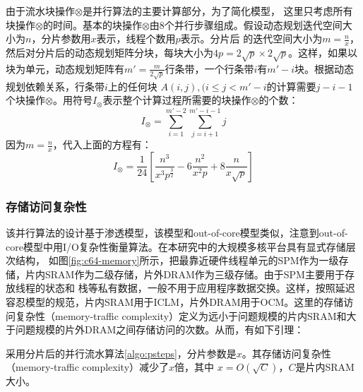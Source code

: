 \begin{flushleft}
由于流水块操作$\otimes$是并行算法的主要计算部分，为了简化模型，
这里只考虑所有块操作$\otimes$的时间。基本的块操作$\otimes$由8个并行步骤组成。假设动态规划迭代空间大小为$n$，分片参数用$x$表示，线程个数用$p$表示。分片后
的迭代空间大小为$m=\frac{n}{x}$，然后对分片后的动态规划矩阵分块，每块大小为$4p=2\sqrt{p}\times
2\sqrt{p}$。这样，如果以块为单元，动态规划矩阵有$m'=\frac{m}{2\sqrt{p}}$行条带，一个行条带$i$有$m'-i$块。根据动态规划依赖关系，行条带$i$上的任何块
$A(i,j),(i\le
j<m'-i$的计算需要$j-i-1$个块操作$\otimes$。用符号$I_{\otimes}$表示整个计算过程所需要的块操作$\otimes$的个数：
\begin{displaymath}
I_{\otimes} = \sum_{i=1}^{m'-2}\sum_{j=i+1}^{m'-i-1}j %
\end{displaymath}
因为$m=\frac{n}{x}$，代入上面的方程有：
\begin{equation}\label{eq:iters}
I_{\otimes} = \frac{1}{24}[\frac{n^{3}}{x^{3}p^{\frac{3}{2}}}-6\frac{n^{2}}{x^{2}p}+8\frac{n}{x\sqrt{p}}]
\end{equation}


\subsubsection{存储访问复杂性}
该并行算法的设计基于渗透模型，该模型和out-of-core模型类似，注意到out-of-core模型中用I/O复杂性衡量算法。在本研究中的大规模多核平台具有显式存储层次结构，
如图\ref{fig:c64-memory}所示，把最靠近硬件线程单元的SPM作为一级存储，片内SRAM作为二级存储，片外DRAM作为三级存储。由于SPM主要用于存放线程的状态和
栈等私有数据，一般不用于应用程序数据交换。这样，按照延迟容忍模型的规范，片内SRAM用于ICLM，片外DRAM用于OCM。这里的存储访问复杂性（memory-traffic
complexity）定义为远小于问题规模的片内SRAM和大于问题规模的片外DRAM之间存储访问的次数。从而，有如下引理：
\begin{lemma}\label{lemma:memory_complexity}
	采用分片后的并行流水算法\ref{algo:psteps}，分片参数是$x$。其存储访问复杂性（memory-traffic complexity）减少了$x$倍，其中
	$x=O(\sqrt{C})$，$C$是片内SRAM大小。
\end{lemma}


\end{flushleft}
